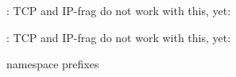 
\begin{DoxyRefList}
\item[\label{todo__todo000001}%
\hypertarget{todo__todo000001}{}%
global\+Scope$>$ Member \hyperlink{opt_8h_abafb9f64a80e51b56c0abbcfc1f7e04e}{L\+W\+I\+P\+\_\+\+N\+E\+T\+I\+F\+\_\+\+T\+X\+\_\+\+S\+I\+N\+G\+L\+E\+\_\+\+P\+B\+U\+F} ]\+: T\+C\+P and I\+P-\/frag do not work with this, yet\+: 

\+: T\+C\+P and I\+P-\/frag do not work with this, yet\+:  
\item[\label{todo__todo000002}%
\hypertarget{todo__todo000002}{}%
File \hyperlink{snmp__structs_8h}{snmp\+\_\+structs.h} ]namespace prefixes 
\end{DoxyRefList}